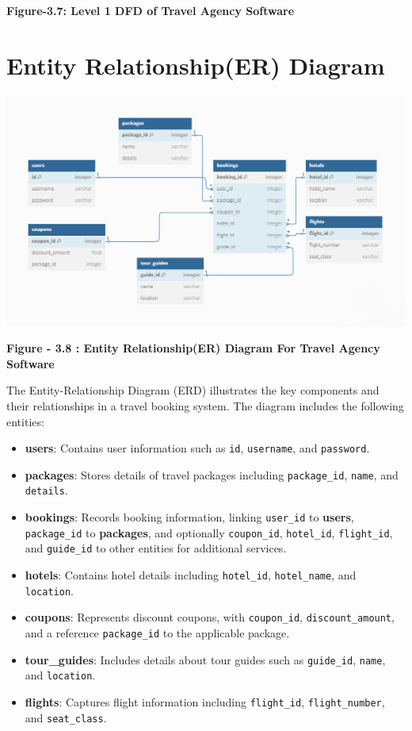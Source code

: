 \documentclass{scrreprt}
\begin{document}
\begin{center}
    \parbox{0.8\textwidth}{ 
        \centering
        \textbf{Figure-3.7: Level 1 DFD of Travel Agency Software}
    }
\end{center}


\section{Entity Relationship(ER) Diagram}

{\includegraphics[width=\textwidth]{erd.png}}

\begin{center}
    \parbox{0.8\textwidth}{ 
        \centering
        \textbf{Figure - 3.8 : Entity Relationship(ER) Diagram For Travel Agency Software}
    }
\end{center}

The Entity-Relationship Diagram (ERD) illustrates the key components and their relationships in a travel booking system. The diagram includes the following entities:

\begin{itemize}
    \item \textbf{users}: Contains user information such as \texttt{id}, \texttt{username}, and \texttt{password}.
    \item \textbf{packages}: Stores details of travel packages including \texttt{package\_id}, \texttt{name}, and \texttt{details}.
    \item \textbf{bookings}: Records booking information, linking \texttt{user\_id} to \textbf{users}, \texttt{package\_id} to \textbf{packages}, and optionally \texttt{coupon\_id}, \texttt{hotel\_id}, \texttt{flight\_id}, and \texttt{guide\_id} to other entities for additional services.
    \item \textbf{hotels}: Contains hotel details including \texttt{hotel\_id}, \texttt{hotel\_name}, and \texttt{location}.
    \item \textbf{coupons}: Represents discount coupons, with \texttt{coupon\_id}, \texttt{discount\_amount}, and a reference \texttt{package\_id} to the applicable package.
    \item \textbf{tour\_guides}: Includes details about tour guides such as \texttt{guide\_id}, \texttt{name}, and \texttt{location}.
    \item \textbf{flights}: Captures flight information including \texttt{flight\_id}, \texttt{flight\_number}, and \texttt{seat\_class}.
\end{itemize}
\end{document}
